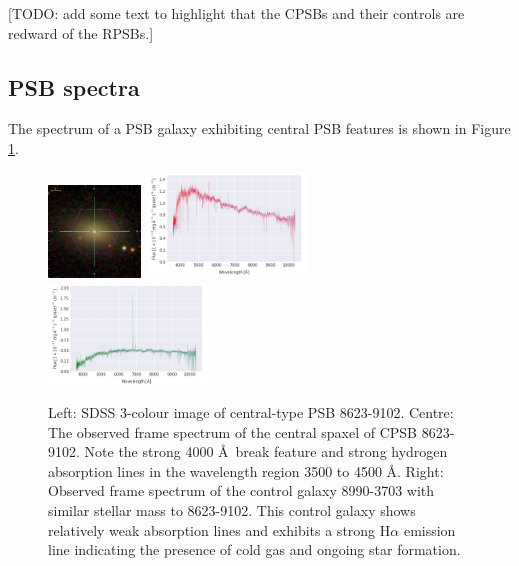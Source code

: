 [TODO: add some text to highlight that the CPSBs and their controls are redward of the RPSBs.]

\subsection{PSB spectra}
The spectrum of a PSB galaxy exhibiting central PSB features is shown in Figure \ref{fig:CPSB-8623-9102-spec}.
\begin{figure}
    \centering
    \includegraphics[width=0.22\textwidth]{images/Cutouts/CPSB-8623-9102-IM.png}
    \hfill
    \includegraphics[width=0.38\textwidth]{images/Spectra/CPSB-8623-9102.png}
    \hfill
    \includegraphics[width=0.38\textwidth]{images/Spectra/CPSB-CTRL-8990-3703-spec.png}
    \caption{Left: SDSS 3-colour image of central-type PSB 8623-9102. 
    Centre: The observed frame spectrum of the central spaxel of CPSB  8623-9102. Note the strong 4000 \AA\ break feature and strong hydrogen absorption lines in the wavelength region 3500 to 4500 \AA.
    Right: Observed frame spectrum of the control galaxy 8990-3703 with similar stellar mass to 8623-9102. This control galaxy shows relatively weak absorption lines and exhibits a strong H$\alpha$ emission line indicating the presence of cold gas and ongoing star formation.}
    \label{fig:CPSB-8623-9102-spec}
\end{figure}


